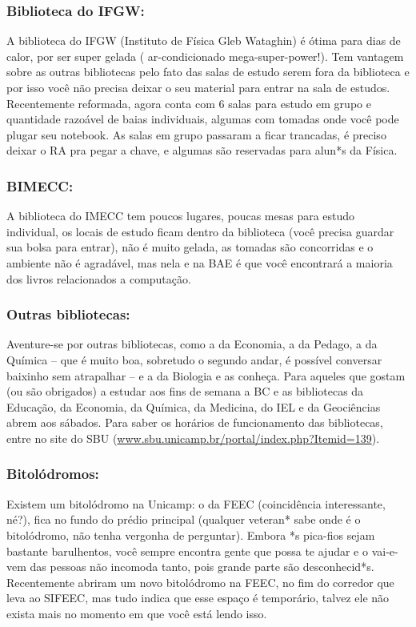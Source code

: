\subsubsection{Biblioteca do IFGW:} A biblioteca do IFGW (Instituto de Física
Gleb Wataghin) é ótima para dias de calor, por ser super gelada (
ar-condicionado mega-super-power!). Tem vantagem sobre as outras bibliotecas
pelo fato das salas de estudo serem fora da biblioteca e por isso você não
precisa deixar o seu material para entrar na sala de estudos. Recentemente
reformada, agora conta com 6 salas para estudo em grupo e quantidade razoável
de baias individuais, algumas com tomadas onde você pode plugar seu notebook.
As salas em grupo passaram a ficar trancadas, é preciso deixar o RA pra pegar a
chave, e algumas são reservadas para alun*s da Física.

\subsubsection{BIMECC:} A biblioteca do IMECC tem poucos lugares, poucas mesas
para estudo individual, os locais de estudo ficam dentro da biblioteca (você
precisa guardar sua bolsa para entrar), não é muito gelada, as tomadas são
concorridas e o ambiente não é agradável, mas nela e na BAE é que você
encontrará a maioria dos livros relacionados a computação.

\subsubsection{Outras bibliotecas:} Aventure-se por outras bibliotecas, como a
da Economia, a da Pedago, a da Química -- que é muito boa, sobretudo o segundo
andar, é possível conversar baixinho sem atrapalhar -- e a da Biologia e as
conheça. Para aqueles que gostam (ou são obrigados) a estudar aos fins de
semana a BC e as bibliotecas da Educação, da Economia, da Química, da Medicina,
do IEL e da Geociências abrem aos sábados. Para saber os horários de
funcionamento das bibliotecas, entre no site do SBU
(\url{www.sbu.unicamp.br/portal/index.php?Itemid=139}).

\subsubsection{Bitolódromos:} Existem um bitolódromo na Unicamp: o da FEEC
(coincidência interessante, né?), fica no fundo do prédio principal (qualquer
veteran* sabe onde é o bitolódromo, não tenha vergonha de perguntar). Embora *s
pica-fios sejam bastante barulhentos, você sempre encontra gente que possa te
ajudar e o vai-e-vem das pessoas não incomoda tanto, pois grande parte são
desconhecid*s. Recentemente abriram um novo bitolódromo na FEEC, no fim do
corredor que leva ao SIFEEC, mas tudo indica que esse espaço é temporário,
talvez ele não exista mais no momento em que você está lendo isso.


